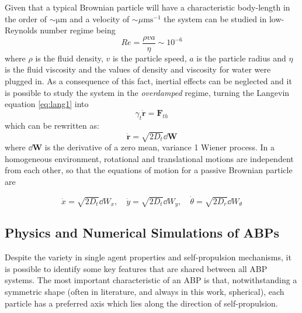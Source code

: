 \documentclass[../../master_thesis_np.tex]{subfiles}
\begin{document}
	Given that a typical Brownian particle will have a characteristic body-length in the order of $ \mathrm{\sim\mu m}$ and a velocity of $\sim\mu \mathrm{m s}^{-1}$ the system can be studied in low-Reynolds number regime being 
	\[Re = \frac{\rho v a}{\eta} \sim 10^{-6} \]  
	where $\rho$ is the fluid density, $v$ is the particle speed, $a$ is the particle radius and $\eta$ is the fluid viscosity and the values of density and viscosity for water were plugged in. As a consequence of this fact, inertial effects can be neglected and it is possible to study the system in the \emph{overdamped} regime, turning the Langevin equation \ref{eq:lang1} into
	\begin{equation} \label{eq:lang2}
		\gamma_t \mathbf{\dot{r}} = \mathbf{F}_{th}
	\end{equation}
	which can be rewritten as:
	\begin{equation}
		\mathbf{\dot{r}} = \sqrt{2D_t} \dd{\mathbf{W}}
	\end{equation}
	where $\dd{\mathbf{W}}$ is the derivative of a zero mean, variance 1 Wiener process.
	In a homogeneous environment, rotational and translational motions are independent from each other, so that the equations of motion for a passive Brownian particle are
	
	\begin{equation}
		\dot{x} = \sqrt{2D_t}\dd{W_x}, \quad \dot{y} = \sqrt{2D_t}\dd{W_y}, \quad \dot{\theta} = \sqrt{2D_r}\dd{W_{\theta}}
	\end{equation}
	
	
	\subsection[ABP simulations]{Physics and Numerical Simulations of ABPs}
		Despite the variety in single agent properties and self-propulsion mechanisms, it is possible to identify some key features that are shared between all ABP systems. The most important characteristic of an ABP is that, notwithstanding a symmetric shape (often in literature, and always in this work, spherical), each particle has a preferred axis which lies along the direction of self-propulsion.
		
\end{document}
